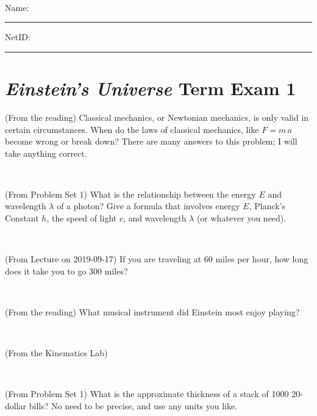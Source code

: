 \documentclass[12pt, letterpaper]{article}
\begin{document}
\vfill ~


\cleardoublepage



\noindent
Name: \rule[-1ex]{0.60\textwidth}{0.1pt}
NetID: \rule[-1ex]{0.20\textwidth}{0.1pt}

\section*{\textsl{Einstein's Universe} Term Exam 1}
\setcounter{problem}{1}


\begin{problem} (From the reading)
Classical mechanics, or Newtonian mechanics, is only valid in certain
circumstances. When do the laws of classical mechanics, like $F =
m\,a$ become wrong or break down? There are many answers to this
problem; I will take anything correct.
\end{problem}


\vfill ~

\begin{problem} (From Problem Set 1)
What is the relationship between the energy $E$ and wavelength
$\lambda$ of a photon? Give a formula that involves energy $E$,
Planck's Constant $h$, the speed of light $c$, and wavelength
$\lambda$ (or whatever you need).
\end{problem}

\vfill ~

\begin{problem} (From Lecture on 2019-09-17)
If you are traveling at 60 miles per hour, how long does
it take you to go 300 miles?
\end{problem}


\vfill ~

\begin{problem} (From the reading)
What musical instrument did Einstein most enjoy playing?
\end{problem}


\vfill ~


\clearpage


\begin{problem} (From the Kinematics Lab)

\end{problem}


\vfill ~

\begin{problem} (From Problem Set 1)
What is the approximate thickness of a stack of 1000 20-dollar bills?
No need to be precise, and use any units you like.
\end{problem}
\end{document}

